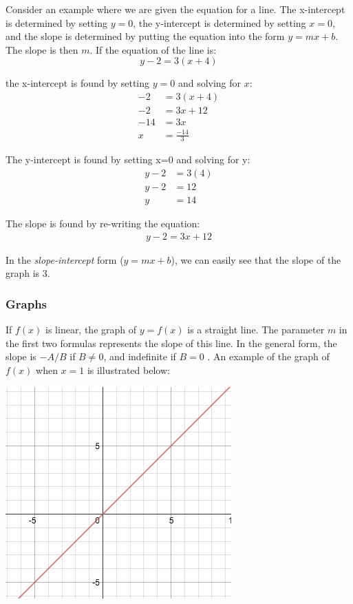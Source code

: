 \documentclass[11pt,oneside]{book}              %
\begin{document}
Consider an example where we are given the equation for a line. The x-intercept is determined by setting $y=0$, the y-intercept is determined by setting $x = 0$, and the slope is determined by putting the equation into the form $y = mx + b$. The slope is then $m$. If the equation of the line is:
\begin{equation*}
	y - 2 = 3(x + 4)
\end{equation*}

the x-intercept is found by setting $y = 0$ and solving for $x$:
\begin{align}
	-2 &= 3(x + 4)\\
	-2 &= 3x + 12\\
	-14 &= 3x\\
	x &= \frac{-14}{3}
\end{align}

The y-intercept is found by setting x=0 and solving for y:
\begin{align}
	y - 2 &= 3(4)\\
	y - 2 &= 12\\
	y &= 14
\end{align}

The slope is found by re-writing the equation:
\begin{align}
	y - 2 = 3x+12
\end{align}

In the \textit{slope-intercept} form ($y = mx + b$), we can easily see that the slope of the graph is $3$.

\subsubsection{Graphs}
If $f(x)$ is linear, the graph of $y=f(x)$ is a straight line. The parameter $m$ in the first two formulas represents the slope of this line. In the general form, the slope is $-A/B$ if $B \neq 0$, and indefinite if $B=0$ \cite{oregonstatelinear}.
An example of the graph of $f(x)$ when $x = 1$ is illustrated below:
\begin{center}\includegraphics[scale=0.5]{Function_Graph_Draft.png}\end{center}
\end{document}
